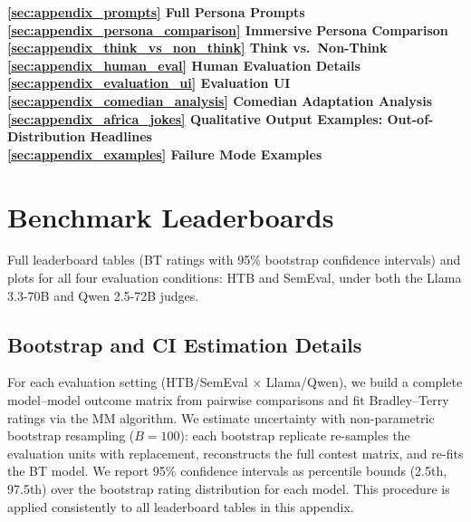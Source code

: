 \documentclass[11pt]{article}
\begin{document}
\textbf{\ref{sec:appendix_prompts} Full Persona Prompts} \dotfill \pageref{sec:appendix_prompts}\\[0.5ex]
\textbf{\ref{sec:appendix_persona_comparison} Immersive Persona Comparison} \dotfill \pageref{sec:appendix_persona_comparison}\\[0.5ex]
\textbf{\ref{sec:appendix_think_vs_non_think} Think vs.\ Non-Think} \dotfill \pageref{sec:appendix_think_vs_non_think}\\[0.5ex]
\textbf{\ref{sec:appendix_human_eval} Human Evaluation Details} \dotfill \pageref{sec:appendix_human_eval}\\[0.5ex]
\textbf{\ref{sec:appendix_evaluation_ui} Evaluation UI} \dotfill \pageref{sec:appendix_evaluation_ui}\\[0.5ex]
\textbf{\ref{sec:appendix_comedian_analysis} Comedian Adaptation Analysis} \dotfill \pageref{sec:appendix_comedian_analysis}\\[0.5ex]
\textbf{\ref{sec:appendix_africa_jokes} Qualitative Output Examples: Out-of-Distribution Headlines} \dotfill \pageref{sec:appendix_africa_jokes}\\[0.5ex]
\textbf{\ref{sec:appendix_examples} Failure Mode Examples} \dotfill \pageref{sec:appendix_examples}
\vspace{1.5em}

\clearpage

\section{Benchmark Leaderboards}
\label{sec:appendix_leaderboards}
Full leaderboard tables (BT ratings with 95\% bootstrap confidence intervals) and plots for all four evaluation conditions: HTB and SemEval, under both the Llama 3.3-70B and Qwen 2.5-72B judges.

\subsection{Bootstrap and CI Estimation Details}
For each evaluation setting (HTB/SemEval $\times$ Llama/Qwen), we build a complete model--model outcome matrix from pairwise comparisons and fit Bradley--Terry ratings via the MM algorithm. We estimate uncertainty with non-parametric bootstrap resampling ($B=100$): each bootstrap replicate re-samples the evaluation units with replacement, reconstructs the full contest matrix, and re-fits the BT model. We report 95\% confidence intervals as percentile bounds (2.5th, 97.5th) over the bootstrap rating distribution for each model. This procedure is applied consistently to all leaderboard tables in this appendix.
\end{document}
